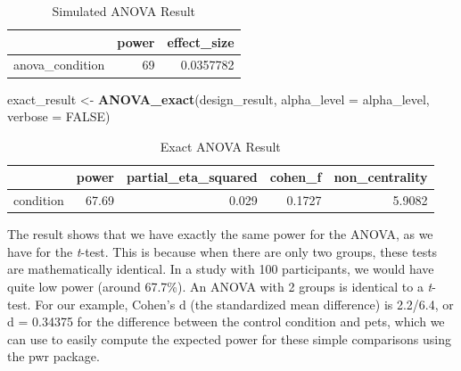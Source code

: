 \documentclass[]{book}
\newenvironment{Shaded}{\begin{snugshade}}{\end{snugshade}}
\newcommand{\DataTypeTok}[1]{\textcolor[rgb]{0.13,0.29,0.53}{#1}}
\newcommand{\DecValTok}[1]{\textcolor[rgb]{0.00,0.00,0.81}{#1}}
\newcommand{\FloatTok}[1]{\textcolor[rgb]{0.00,0.00,0.81}{#1}}
\newcommand{\KeywordTok}[1]{\textcolor[rgb]{0.13,0.29,0.53}{\textbf{#1}}}
\newcommand{\NormalTok}[1]{#1}
\newcommand{\OperatorTok}[1]{\textcolor[rgb]{0.81,0.36,0.00}{\textbf{#1}}}
\newcommand{\OtherTok}[1]{\textcolor[rgb]{0.56,0.35,0.01}{#1}}
\newcommand{\StringTok}[1]{\textcolor[rgb]{0.31,0.60,0.02}{#1}}
\begin{document}
\begin{table}[t]

\caption{\label{tab:unnamed-chunk-7}Simulated ANOVA Result}
\centering
\begin{tabular}{l|r|r}
\hline
  & power & effect\_size\\
\hline
anova\_condition & 69 & 0.0357782\\
\hline
\end{tabular}
\end{table}

\begin{Shaded}
\begin{Highlighting}[]
\NormalTok{exact_result <-}\StringTok{ }\KeywordTok{ANOVA_exact}\NormalTok{(design_result,}
                            \DataTypeTok{alpha_level =}\NormalTok{ alpha_level,}
                            \DataTypeTok{verbose =} \OtherTok{FALSE}\NormalTok{)}
\end{Highlighting}
\end{Shaded}

\begin{table}[t]

\caption{\label{tab:unnamed-chunk-9}Exact ANOVA Result}
\centering
\begin{tabular}{l|r|r|r|r}
\hline
  & power & partial\_eta\_squared & cohen\_f & non\_centrality\\
\hline
condition & 67.69 & 0.029 & 0.1727 & 5.9082\\
\hline
\end{tabular}
\end{table}

The result shows that we have exactly the same power for the ANOVA, as we have for the \emph{t}-test. This is because when there are only two groups, these tests are mathematically identical. In a study with 100 participants, we would have quite low power (around 67.7\%). An ANOVA with 2 groups is identical to a \emph{t}-test. For our example, Cohen's d (the standardized mean difference) is 2.2/6.4, or d = 0.34375 for the difference between the control condition and pets, which we can use to easily compute the expected power for these simple comparisons using the pwr package.

\begin{Shaded}
\end{Shaded}
\end{document}
